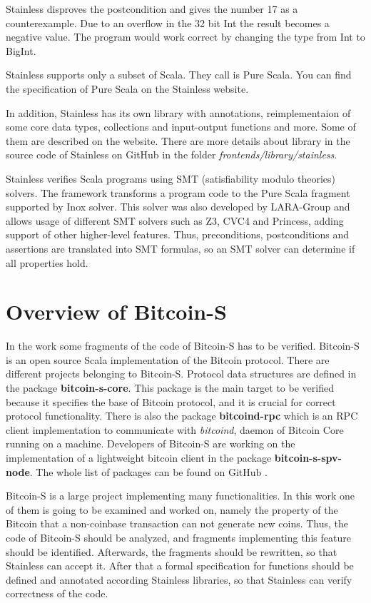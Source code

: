 Stainless disproves the postcondition and gives the number 17 as a counterexample.
Due to an overflow in the 32 bit Int the result becomes a negative value.
The program would work correct by changing the type from Int to BigInt.

Stainless supports only a subset of Scala.
They call is Pure Scala.
You can find the specification of Pure Scala on the Stainless website.\cite{Stainless:pure_scala}

In addition, Stainless has its own library with annotations, reimplementaion of some core data types, collections and input-output functions and more.
Some of them are described on the website.\cite{Stainless:library}
There are more details about library in the source code of Stainless on GitHub in the folder \textit{frontends/library/stainless}.\cite{Stainless:github} 

Stainless verifies Scala programs using SMT (satisfiability modulo theories) solvers. 
The framework transforms a program code to the Pure Scala fragment supported by Inox solver.
This solver was also developed by LARA-Group and allows usage of different SMT solvers such as Z3, CVC4 and Princess, adding support of other higher-level features.
Thus, preconditions, postconditions and assertions are translated into SMT formulas, so an SMT solver can determine if all properties hold.\cite{Stainless:introduction}\cite{Stainless}


\section{Overview of Bitcoin-S}
\label{sec:bitcoin_s}

In the work some fragments of the code of Bitcoin-S has to be verified.
Bitcoin-S is an open source Scala implementation of the Bitcoin protocol. 
There are different projects belonging to Bitcoin-S.
Protocol data structures are defined in the package \textbf{bitcoin-s-core}.
This package is the main target to be verified because it specifies the base of Bitcoin protocol, and it is crucial for correct protocol functionality.
There is also the package \textbf{bitcoind-rpc} which is an RPC client implementation to communicate with \textit{bitcoind}, daemon of Bitcoin Core running on a machine.
Developers of Bitcoin-S are working on the implementation of a lightweight bitcoin client in the package \textbf{bitcoin-s-spv-node}.
The whole list of packages can be found on GitHub \cite{BitcoinSProject}.

Bitcoin-S is a large project implementing many functionalities.
In this work one of them is going to be examined and worked on, namely the property of the Bitcoin that a non-coinbase transaction can not generate new coins.
Thus, the code of Bitcoin-S should be analyzed, and fragments implementing this feature should be identified.
Afterwards, the fragments should be rewritten, so that Stainless can accept it.
After that a formal specification for functions should be defined and annotated according Stainless libraries, so that Stainless can verify correctness of the code.


